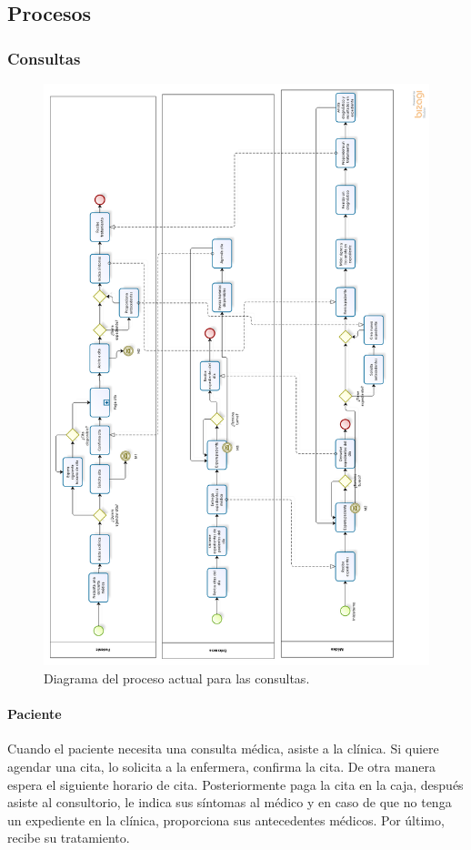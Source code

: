 \subsection{Procesos}
	\subsubsection{Consultas}
	\begin{figure}[htbp!]
		\centering
		\includegraphics[width=\textwidth]{images/procesos/consultas_old}
		\caption{Diagrama del proceso actual para las consultas.}
	\end{figure}
	\paragraph{Paciente}
	Cuando el paciente necesita una consulta médica, asiste a la clínica. Si quiere agendar una cita, lo solicita a la enfermera, confirma la cita. De otra manera espera el siguiente horario de cita. Posteriormente paga la cita en la caja, después asiste al consultorio, le indica sus síntomas al médico y en caso de que no tenga un expediente en la clínica, proporciona sus antecedentes médicos. Por último, recibe su tratamiento.
